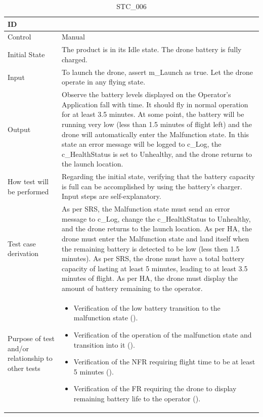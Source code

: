 \documentclass[12pt, titlepage]{article}
\begin{document}
\begin{table}[!h]
\begin{center}
\caption {STC\_006}
\label{tab:STC_006}
\begin{tabular}{ | m{3.2cm} | m{12.2cm} | } 
\hline
ID & \nameref{tab:STC_006} \\ 
\hline
Control & Manual \\ 
\hline
Initial State & The product is in its Idle state. The drone battery is fully charged. \\ 
\hline
Input & To launch the drone, assert m\_Launch as true. Let the drone operate in any flying state. \\ 
\hline
Output & Observe the battery levels displayed on the Operator’s Application fall with time. It should fly in normal operation for at least 3.5 minutes.
At some point, the battery will be running very low (less than 1.5 minutes of flight left) and the drone will automatically enter the Malfunction state. In this state an error message will be logged to c\_Log, the c\_HealthStatus is set to Unhealthy, and the drone returns to the launch location. \\ 
\hline
How test will be performed & Regarding the initial state, verifying that the battery capacity is full can be accomplished by using the battery's charger. Input steps are self-explanatory. \\ 
\hline
Test case derivation & As per SRS, the Malfunction state must send an error message to c\_Log, change the c\_HealthStatus to Unhealthy, and the drone returns to the launch location.
As per HA, the drone must enter the Malfunction state and land itself when the remaining battery is detected to be low (less then 1.5 minutes). As per SRS, the drone must have a total battery capacity of lasting at least 5 minutes, leading to at least 3.5 minutes of flight.
As per HA, the drone must display the amount of battery remaining to the operator. 
 \\ 
\hline
Purpose of test and/or relationship to other tests & 
\begin{itemize}
    \item Verification of the low battery transition to the malfunction state (\nameref{SR_011}). 
    \item Verification of the operation of the malfunction state and transition into it (\nameref{STA_009}).
    \item Verification of the NFR requiring flight time to be at least 5 minutes (\nameref{USE_003}). 
    \item Verification of the FR requiring the drone to display remaining battery life to the operator (\nameref{SR_003}). 
\end{itemize}
\\ 
\hline
\end{tabular}
\end{center}
\end{table}
\end{document}
